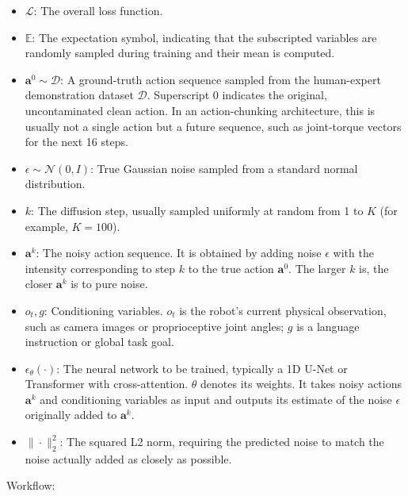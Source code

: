 \begin{itemize}
\tightlist
\item
  \(\mathcal{L}\): The overall loss function.
\item
  \(\mathbb{E}\): The expectation symbol, indicating that the subscripted variables are randomly sampled during training and their mean is computed.
\item
  \(\mathbf{a}^0\sim\mathcal{D}\): A ground-truth action sequence sampled from the human-expert demonstration dataset \(\mathcal{D}\). Superscript 0 indicates the original, uncontaminated clean action. In an action-chunking architecture, this is usually not a single action but a future sequence, such as joint-torque vectors for the next 16 steps.
\item
  \(\epsilon\sim\mathcal{N}(0,I)\): True Gaussian noise sampled from a standard normal distribution.
\item
  \(k\): The diffusion step, usually sampled uniformly at random from 1 to \(K\) (for example, \(K=100\)).
\item
  \(\mathbf{a}^k\): The noisy action sequence. It is obtained by adding noise \(\epsilon\) with the intensity corresponding to step \(k\) to the true action \(\mathbf{a}^0\). The larger \(k\) is, the closer \(\mathbf{a}^k\) is to pure noise.
\item
  \(o_t,g\): Conditioning variables. \(o_t\) is the robot's current physical observation, such as camera images or proprioceptive joint angles; \(g\) is a language instruction or global task goal.
\item
  \(\epsilon_\theta(\cdot)\): The neural network to be trained, typically a 1D U-Net or Transformer with cross-attention. \(\theta\) denotes its weights. It takes noisy actions \(\mathbf{a}^k\) and conditioning variables as input and outputs its estimate of the noise \(\epsilon\) originally added to \(\mathbf{a}^k\).
\item
  \(\|\cdot\|_2^2\): The squared L2 norm, requiring the predicted noise to match the noise actually added as closely as possible.
\end{itemize}

Workflow:

